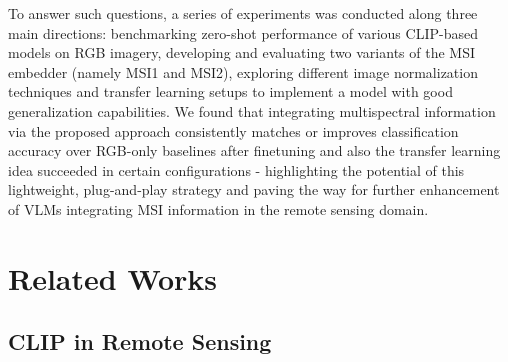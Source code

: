 \documentclass[a4paper, oneside, english]{sapthesis} %
\begin{document}
To answer such questions, a series of experiments was conducted along three main directions: benchmarking zero-shot performance of various CLIP-based models on RGB imagery, developing and evaluating two variants of the MSI embedder (namely MSI1 and MSI2), exploring different image normalization techniques and transfer learning setups to implement a model with good generalization capabilities. We found that integrating multispectral information via the proposed approach consistently matches or improves classification accuracy over RGB-only baselines after finetuning and also the transfer learning idea succeeded in certain configurations - highlighting the potential of this lightweight, plug-and-play strategy and paving the way for further enhancement of VLMs integrating MSI information in the remote sensing domain.

\chapter{Related Works} %

\section{CLIP in Remote Sensing}
\end{document}
